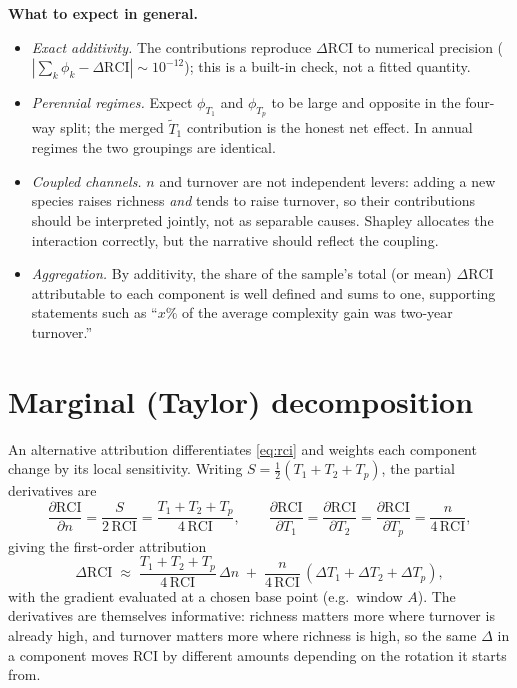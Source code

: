 \documentclass[11pt]{article}
\newcommand{\RCI}{\mathrm{RCI}}
\begin{document}
\medskip
\noindent\textbf{What to expect in general.}
\begin{itemize}
\item \emph{Exact additivity.} The contributions reproduce $\Delta\RCI$ to
numerical precision ($|\sum_k\phi_k-\Delta\RCI|\sim10^{-12}$); this is a built-in
check, not a fitted quantity.
\item \emph{Perennial regimes.} Expect $\phi_{T_1}$ and $\phi_{T_p}$ to be large
and opposite in the four-way split; the merged $\tilde T_1$ contribution is the
honest net effect. In annual regimes the two groupings are identical.
\item \emph{Coupled channels.} $n$ and turnover are not independent levers: adding
a new species raises richness \emph{and} tends to raise turnover, so their
contributions should be interpreted jointly, not as separable causes. Shapley
allocates the interaction correctly, but the narrative should reflect the
coupling.
\item \emph{Aggregation.} By additivity, the share of the sample's total (or
mean) $\Delta\RCI$ attributable to each component is well defined and sums to one,
supporting statements such as ``$x\%$ of the average complexity gain was
two-year turnover.''
\end{itemize}

\section{Marginal (Taylor) decomposition}

An alternative attribution differentiates \eqref{eq:rci} and weights each
component change by its local sensitivity. Writing $S=\tfrac12(T_1+T_2+T_p)$, the
partial derivatives are
\begin{equation}
\frac{\partial\RCI}{\partial n}=\frac{S}{2\,\RCI}
=\frac{T_1+T_2+T_p}{4\,\RCI},
\qquad
\frac{\partial\RCI}{\partial T_1}
=\frac{\partial\RCI}{\partial T_2}
=\frac{\partial\RCI}{\partial T_p}
=\frac{n}{4\,\RCI},
\end{equation}
giving the first-order attribution
\begin{equation}
\Delta\RCI\;\approx\;
\frac{T_1+T_2+T_p}{4\,\RCI}\,\Delta n
\;+\;\frac{n}{4\,\RCI}\,(\Delta T_1+\Delta T_2+\Delta T_p),
\label{eq:taylor}
\end{equation}
with the gradient evaluated at a chosen base point (e.g.\ window $A$). The
derivatives are themselves informative: richness matters more where turnover is
already high, and turnover matters more where richness is high, so the same
$\Delta$ in a component moves RCI by different amounts depending on the rotation
it starts from.
\end{document}
